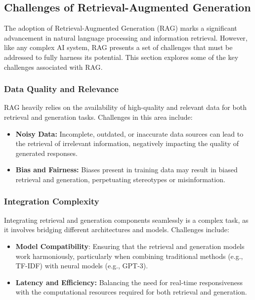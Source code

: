 \subsection{Challenges of Retrieval-Augmented Generation}

The adoption of Retrieval-Augmented Generation (RAG) marks a significant advancement in natural language processing and information retrieval. However, like any complex AI system, RAG presents a set of challenges that must be addressed to fully harness its potential. This section explores some of the key challenges associated with RAG.

\subsubsection*{Data Quality and Relevance}

RAG heavily relies on the availability of high-quality and relevant data for both retrieval and generation tasks. Challenges in this area include:

\begin{itemize}
    \item \textbf{Noisy Data:} Incomplete, outdated, or inaccurate data sources can lead to the retrieval of irrelevant information, negatively impacting the quality of generated responses.

    \item \textbf{Bias and Fairness:} Biases present in training data may result in biased retrieval and generation, perpetuating stereotypes or misinformation.
\end{itemize}

\subsubsection*{Integration Complexity}

Integrating retrieval and generation components seamlessly is a complex task, as it involves bridging different architectures and models. Challenges include:

\begin{itemize}
    \item \textbf{Model Compatibility}: Ensuring that the retrieval and generation models work harmoniously, particularly when combining traditional methods (e.g., TF-IDF) with neural models (e.g., GPT-3).

    \item \textbf{Latency and Efficiency:} Balancing the need for real-time responsiveness with the computational resources required for both retrieval and generation.
\end{itemize}


